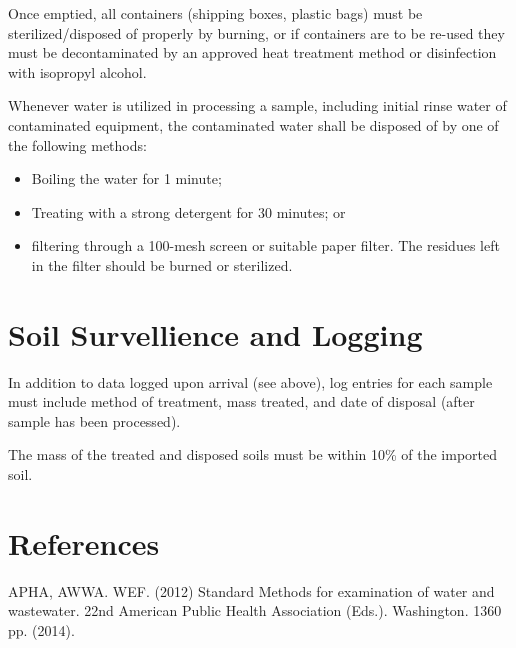 \documentclass[12pt]{../SOP3}\usepackage[]{graphicx}\usepackage[]{color}
\begin{document}
\NP Once emptied, all containers (shipping boxes, plastic bags) must be sterilized/disposed of properly by burning, or if containers are to be re-used they must be decontaminated by an approved heat treatment method or disinfection with isopropyl alcohol.

\NP Whenever water is utilized in processing a sample, including initial rinse water of contaminated equipment, the contaminated water shall be disposed of by one of the following methods: 

\begin{itemize}
  \item Boiling the water for 1 minute; 
  \item Treating with a strong detergent for 30 minutes; or 
  \item filtering through a 100-mesh screen or suitable paper filter. The residues left in the filter should be burned or sterilized.
\end{itemize}


\section{Soil Survellience and Logging}

\NP In addition to data logged upon arrival (see above), log entries for each sample must include method of treatment, mass treated, and date of disposal (after sample has been processed).

\NP The mass of the treated and disposed soils must be within 10\% of the imported soil.


\section{References}

\NP APHA, AWWA. WEF. (2012) Standard Methods for examination of water and wastewater. 22nd American Public Health Association (Eds.). Washington. 1360 pp. (2014).
\end{document}
